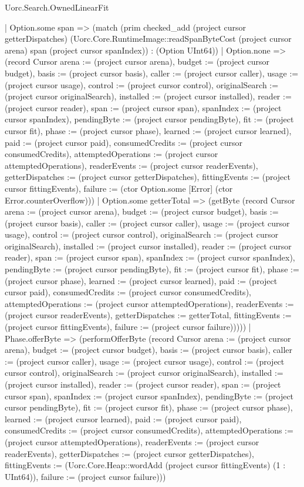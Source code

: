 \begin{lexlean}{Uorc.Search.OwnedLinearFit}
\begin{semanticmodule}
{      | Option.some span => (match (prim checked_add (project cursor getterDispatches) (Uorc.Core.RuntimeImage::readSpanByteCost (project cursor arena) span (project cursor spanIndex)) : (Option UInt64))
        | Option.none => (record Cursor {arena := (project cursor arena), budget := (project cursor budget), basis := (project cursor basis), caller := (project cursor caller), usage := (project cursor usage), control := (project cursor control), originalSearch := (project cursor originalSearch), installed := (project cursor installed), reader := (project cursor reader), span := (project cursor span), spanIndex := (project cursor spanIndex), pendingByte := (project cursor pendingByte), fit := (project cursor fit), phase := (project cursor phase), learned := (project cursor learned), paid := (project cursor paid), consumedCredits := (project cursor consumedCredits), attemptedOperations := (project cursor attemptedOperations), readerEvents := (project cursor readerEvents), getterDispatches := (project cursor getterDispatches), fittingEvents := (project cursor fittingEvents), failure := (ctor Option.some [Error] (ctor Error.counterOverflow))})
        | Option.some getterTotal => (getByte (record Cursor {arena := (project cursor arena), budget := (project cursor budget), basis := (project cursor basis), caller := (project cursor caller), usage := (project cursor usage), control := (project cursor control), originalSearch := (project cursor originalSearch), installed := (project cursor installed), reader := (project cursor reader), span := (project cursor span), spanIndex := (project cursor spanIndex), pendingByte := (project cursor pendingByte), fit := (project cursor fit), phase := (project cursor phase), learned := (project cursor learned), paid := (project cursor paid), consumedCredits := (project cursor consumedCredits), attemptedOperations := (project cursor attemptedOperations), readerEvents := (project cursor readerEvents), getterDispatches := getterTotal, fittingEvents := (project cursor fittingEvents), failure := (project cursor failure)}))))
    | Phase.offerByte => (performOfferByte (record Cursor {arena := (project cursor arena), budget := (project cursor budget), basis := (project cursor basis), caller := (project cursor caller), usage := (project cursor usage), control := (project cursor control), originalSearch := (project cursor originalSearch), installed := (project cursor installed), reader := (project cursor reader), span := (project cursor span), spanIndex := (project cursor spanIndex), pendingByte := (project cursor pendingByte), fit := (project cursor fit), phase := (project cursor phase), learned := (project cursor learned), paid := (project cursor paid), consumedCredits := (project cursor consumedCredits), attemptedOperations := (project cursor attemptedOperations), readerEvents := (project cursor readerEvents), getterDispatches := (project cursor getterDispatches), fittingEvents := (Uorc.Core.Heap::wordAdd (project cursor fittingEvents) (1 : UInt64)), failure := (project cursor failure)}))
}
\end{semanticmodule}
\end{lexlean}
